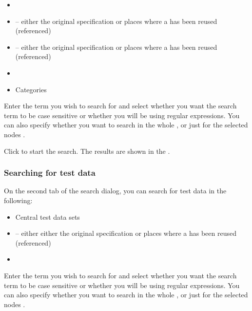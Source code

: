 \begin{itemize}
\item \gdsteps{}
\item \gdcases{} -- either the original specification or places where a \gdcase{} has been reused (referenced)
\item \gdsuites{} -- either the original specification or places where a \gdsuite{} has been reused (referenced)
\item \gdjobs{}
\item Categories
\end{itemize}

Enter the term you wish to search for and select whether you want the search term to be case sensitive or whether you will be using regular expressions. You can also specify whether you want to search in the whole \gdproject{}, or just for the selected nodes .

Click  to start the search. The results are shown in the \gdsearchresultview{} . 


\subsubsection{Searching for test data}
\label{TasksSearchData}

On the second tab of the search dialog, you can search for test data in the following:

\begin{itemize}
\item Central test data sets
\item \gdcases{} -- either either the original specification or places where a \gdcase{} has been reused (referenced)
\item \gdsteps{}
\end{itemize}


Enter the term you wish to search for and select whether you want the search term to be case sensitive or whether you will be using regular expressions. You can also specify whether you want to search in the whole \gdproject{}, or just for the selected nodes .

